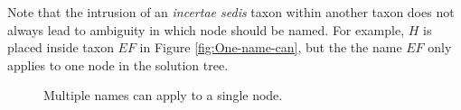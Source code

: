 \documentclass[english]{article}
\begin{document}
Note that the intrusion of an \emph{incertae sedis} taxon within another taxon does not
    always lead to ambiguity in which node should be named. 
For example, $H$ is placed inside taxon $EF$ in Figure \ref{fig:One-name-can}, but the
    the name $EF$ only applies to one node in the solution tree.

\begin{figure}
\hfill{}
\hfill{}
\hfill{}
\hfill{}
\caption{\label{fig:Multiple-names-can}Multiple names can apply to a single node.}
\end{figure}
\end{document}
